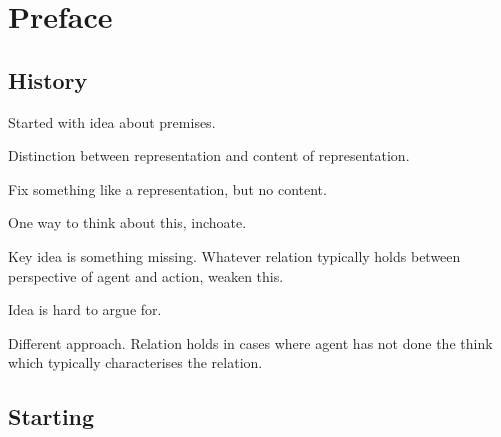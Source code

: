 \chapter{Preface}
\label{cha:introduction}

\section{History}

\begin{note}
  Started with idea about premises.

  Distinction between representation and content of representation.

  Fix something like a representation, but no content.

  One way to think about this, inchoate.
\end{note}

\begin{note}
  Key idea is something missing.
  Whatever relation typically holds between perspective of agent and action, weaken this.
\end{note}

\begin{note}
  Idea is hard to argue for.
\end{note}

\begin{note}
  Different approach.
  Relation holds in cases where agent has not done the think which typically characterises the relation.
\end{note}

\section{Starting}
\nocite{Brown:2004us}

